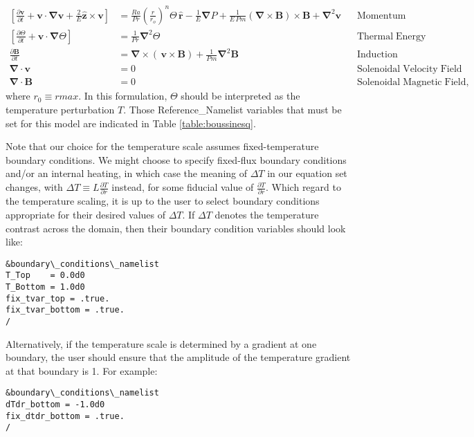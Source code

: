 \begin{align*}
\left[\frac{\partial \boldsymbol{v}}{\partial t} +\boldsymbol{v}\cdot\boldsymbol{\nabla}\boldsymbol{v}  %
                                                         +\frac{2}{E}\boldsymbol{\hat{z}}\times\boldsymbol{v} \right]  &= %
                                                         \frac{Ra}{Pr}\left(\frac{r}{r_o}\right)^n\Theta\,\boldsymbol{\hat{r}} %
                                                         -\frac{1}{E}\boldsymbol{\nabla}P %
                                                         +\frac{1}{E\,Pm}\left(\boldsymbol{\nabla}\times\boldsymbol{B}\right)\times\boldsymbol{B} %
                                                         +\boldsymbol{\nabla}^2\boldsymbol{v} \;\;\; &\mathrm{Momentum}\\
%
%
\left[\frac{\partial \Theta}{\partial t} +\boldsymbol{v}\cdot\boldsymbol{\nabla}\Theta \right] &=
                                             \frac{1}{Pr}\boldsymbol{\nabla}^2\Theta  &\mathrm{Thermal\; Energy}\\ %
%
%
\frac{\partial \boldsymbol{B}}{\partial t} &= \boldsymbol{\nabla}\times\left(\,\boldsymbol{v}\times\boldsymbol{B}\right)+\frac{1}{Pm}\boldsymbol{\nabla}^2\boldsymbol{B} &\mathrm{Induction} \\
%
%
%
%
%
%
\boldsymbol{\nabla}\cdot\boldsymbol{v}&=0 &\mathrm{Solenoidal\; Velocity\; Field}\\
\boldsymbol{\nabla}\cdot\boldsymbol{B}&=0 &\mathrm{Solenoidal\; Magnetic\; Field},
\end{align*}
where $r_0 \equiv rmax$.  In this formulation, $\Theta$ should be interpreted as the temperature perturbation $T$.  Those Reference\_Namelist variables that must be set for this model are indicated in Table \ref{table:boussinesq}.

Note that our choice for the temperature scale assumes fixed-temperature boundary conditions.  We might choose to specify fixed-flux boundary conditions and/or an internal heating, in which case the meaning of $\Delta T$ in our equation set changes, with $\Delta T \equiv L\frac{\partial T}{\partial r}$ instead, for some fiducial value of $\frac{\partial T}{\partial r}$.  Which regard to the temperature scaling, it is up to the user to select boundary conditions appropriate for their desired values of $\Delta T$.  If $\Delta T$ denotes the temperature contrast across the domain, then their boundary condition variables should look like:
\begin{lstlisting}
&boundary\_conditions\_namelist
T_Top    = 0.0d0
T_Bottom = 1.0d0
fix_tvar_top = .true.
fix_tvar_bottom = .true.
/
\end{lstlisting}
Alternatively, if the temperature scale is determined by a gradient at one boundary, the user should ensure that the amplitude of the temperature gradient at that boundary is 1.  For example:
\begin{lstlisting}
&boundary\_conditions\_namelist
dTdr_bottom = -1.0d0
fix_dtdr_bottom = .true.
/
\end{lstlisting}


